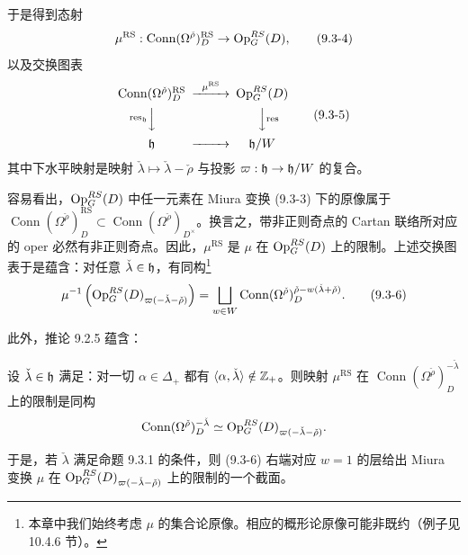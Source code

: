 于是得到态射
\begin{equation}
\mu^{\mathrm{RS}}: \operatorname{Conn}(\Omega^{\check\rho})^{\mathrm{RS}}_D\to\operatorname{Op}^{RS}_G(D),
\tag{9.3-4}
\end{equation}
以及交换图表
\begin{equation}
\begin{CD}
\operatorname{Conn}(\Omega^{\check\rho})^{\mathrm{RS}}_D @>\mu^{\mathrm{RS}}>> \Op^{RS}_G(D)\\
@V{\operatorname{res}_{\fh}}VV @VV{\operatorname{res}}V\\
\fh @>>> \fh/W
\end{CD}
\tag{9.3-5}
\end{equation}
其中下水平映射是映射 $\check\lambda\mapsto\check\lambda-\check\rho$ 与投影 $\varpi:\mathfrak{h}\to\mathfrak{h}/W$ 的复合。

容易看出，$\operatorname{Op}^{RS}_G(D)$ 中任一元素在 Miura 变换 (9.3-3) 下的原像属于 $\operatorname{Conn}(\Omega^{\check\rho})^{\mathrm{RS}}_D\subset\operatorname{Conn}(\Omega^{\check\rho})_{D^\times}$。换言之，带非正则奇点的 Cartan 联络所对应的 oper 必然有非正则奇点。因此，$\mu^{\mathrm{RS}}$ 是 $\mu$ 在 $\operatorname{Op}^{RS}_G(D)$ 上的限制。上述交换图表于是蕴含：对任意 $\check\lambda\in\mathfrak{h}$，有同构\footnote{本章中我们始终考虑 $\mu$ 的集合论原像。相应的概形论原像可能非既约（例子见 10.4.6 节）。}
\begin{equation}
\mu^{-1}\left(\operatorname{Op}^{RS}_G(D)_{\varpi(-\check\lambda-\check\rho)}\right)
= \bigsqcup_{w\in W}\operatorname{Conn}(\Omega^{\check\rho})^{\check\rho-w(\check\lambda+\check\rho)}_D.
\tag{9.3-6}
\end{equation}

此外，推论 9.2.5 蕴含：

\begin{proposition}
设 $\check\lambda\in\mathfrak{h}$ 满足：对一切 $\alpha\in\Delta_+$ 都有 $\langle\alpha,\check\lambda\rangle\notin\mathbb{Z}_+$。则映射 $\mu^{\mathrm{RS}}$ 在 $\operatorname{Conn}(\Omega^{\check\rho})^{-\check\lambda}_D$ 上的限制是同构
\[
\operatorname{Conn}(\Omega^{\check\rho})^{-\check\lambda}_D\simeq\operatorname{Op}^{RS}_G(D)_{\varpi(-\check\lambda-\check\rho)}.
\]
\end{proposition}

于是，若 $\check\lambda$ 满足命题 9.3.1 的条件，则 (9.3-6) 右端对应 $w=1$ 的层给出 Miura 变换 $\mu$ 在 $\operatorname{Op}^{RS}_G(D)_{\varpi(-\check\lambda-\check\rho)}$ 上的限制的一个截面。

